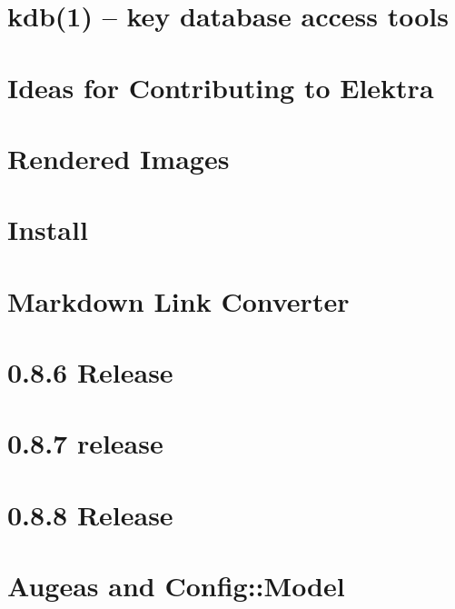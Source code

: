 \let\mypdfximage\pdfximage\def\pdfximage{\immediate\mypdfximage}\documentclass[twoside]{book}
\newcommand{\+}{\discretionary{\mbox{\scriptsize$\hookleftarrow$}}{}{}}
\begin{document}
\chapter{kdb(1) -- key database access tools}
\label{doc_help_kdb_md}

\chapter{Ideas for Contributing to Elektra}
\label{doc_IDEAS_md}

\chapter{Rendered Images}
\label{doc_images_README_md}

\chapter{Install}
\label{doc_INSTALL_md}

\chapter{Markdown Link Converter}
\label{doc_markdownlinkconverter_README_md}

\chapter{0.8.6 Release}
\label{doc_news_2014-06-21_0_8_6_md}

\chapter{0.8.7 release}
\label{doc_news_2014-07-28_0_8_7_md}

\chapter{0.8.8 Release}
\label{doc_news_2014-09-02_0_8_8_md}

\chapter{Augeas and Config\+::Model}
\label{doc_news_2014-10-22_augeas_md}

\end{document}

